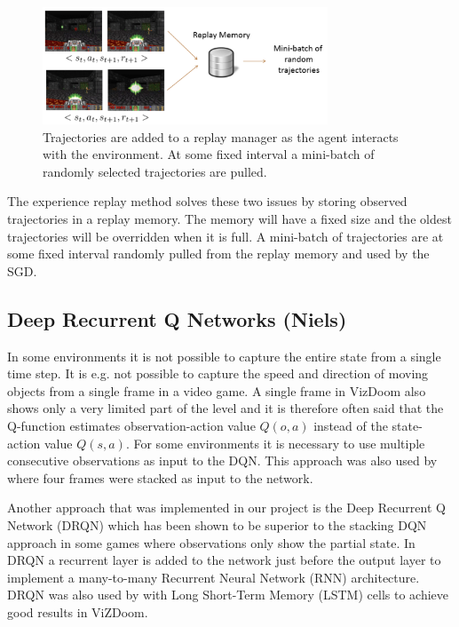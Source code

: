 \documentclass{article}
\begin{document}
\begin{figure}[htb]

\begin{minipage}[b]{1.0\linewidth}
  \centering
  \centerline{\includegraphics[width=8.5cm]{experience}}
\end{minipage}
\caption{Trajectories are added to a replay manager as the agent interacts with the environment. At some fixed interval a mini-batch of randomly selected trajectories are pulled.}
\label{fig:res2}
%
\end{figure}

The experience replay method solves these two issues by storing observed trajectories in a replay memory. The memory will have a fixed size and the oldest trajectories will be overridden when it is full. A mini-batch of trajectories are at some fixed interval randomly pulled from the replay memory and used by the SGD. 

\subsection{Deep Recurrent Q Networks (Niels)}

In some environments it is not possible to capture the entire state from a single time step. It is e.g. not possible to capture the speed and direction of moving objects from a single frame in a video game. A single frame in VizDoom also shows only a very limited part of the level and it is therefore often said that the Q-function estimates observation-action value $Q(o,a)$ instead of the state-action value $Q(s,a)$. For some environments it is necessary to use multiple consecutive observations as input to the DQN. This approach was also used by \cite{mnih2015human} where four frames were stacked as input to the network.

Another approach that was implemented in our project is the Deep Recurrent Q Network (DRQN) which has been shown to be superior to the stacking DQN approach \cite{hausknecht2015deep} in some games where observations only show the partial state. In DRQN a recurrent layer is added to the network just before the output layer to implement a many-to-many Recurrent Neural Network (RNN) architecture. DRQN was also used by \cite{lample2016playing} with Long Short-Term Memory (LSTM) cells to achieve good results in ViZDoom. 
\end{document}
